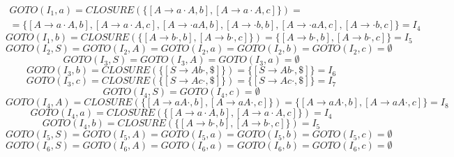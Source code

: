 \documentclass[11pt]{article}
\begin{document}
\begin{multline*}
GOTO(I_1, a) = CLOSURE(\{[A \rightarrow a\cdot A, b], [A \rightarrow a\cdot A, c]\}) = \\
= \{[A \rightarrow a\cdot A, b], [A \rightarrow a\cdot A, c],
[A \rightarrow \cdot aA, b], [A \rightarrow \cdot b, b],
[A \rightarrow \cdot aA, c], [A \rightarrow \cdot b, c]\} = I_4
\end{multline*}
\begin{equation*}
GOTO(I_1, b) = CLOSURE(\{[A \rightarrow b\cdot, b], [A \rightarrow b\cdot, c]\}) =
\{[A \rightarrow b\cdot, b], [A \rightarrow b\cdot, c]\} = I_5
\end{equation*}
\begin{equation*}
GOTO(I_2, S) = GOTO(I_2, A) = GOTO(I_2, a) = GOTO(I_2, b) = GOTO(I_2, c) = \emptyset
\end{equation*}
\begin{equation*}
GOTO(I_3, S) = GOTO(I_3, A) = GOTO(I_3, a) = \emptyset
\end{equation*}
\begin{equation*}
GOTO(I_3, b) = CLOSURE(\{[S \rightarrow Ab\cdot, \$]\}) = \{[S \rightarrow Ab\cdot, \$]\} = I_6
\end{equation*}
\begin{equation*}
GOTO(I_3, c) = CLOSURE(\{[S \rightarrow Ac\cdot, \$]\}) = \{[S \rightarrow Ac\cdot, \$]\} = I_7
\end{equation*}
\begin{equation*}
GOTO(I_4, S) = GOTO(I_4, c) = \emptyset
\end{equation*}
\begin{equation*}
GOTO(I_4, A) = CLOSURE(\{[A \rightarrow aA\cdot, b], [A \rightarrow aA\cdot, c]\}) =
\{[A \rightarrow aA\cdot, b], [A \rightarrow aA\cdot, c]\} = I_8
\end{equation*}
\begin{equation*}
GOTO(I_4, a) = CLOSURE(\{[A \rightarrow a\cdot A, b], [A \rightarrow a\cdot A, c]\}) = I_4
\end{equation*}
\begin{equation*}
GOTO(I_4, b) = CLOSURE(\{[A \rightarrow b\cdot, b], [A \rightarrow b\cdot, c]\}) = I_5
\end{equation*}
\begin{equation*}
GOTO(I_5, S) = GOTO(I_5, A) = GOTO(I_5, a) = GOTO(I_5, b) = GOTO(I_5, c) = \emptyset
\end{equation*}
\begin{equation*}
GOTO(I_6, S) = GOTO(I_6, A) = GOTO(I_6, a) = GOTO(I_6, b) = GOTO(I_6, c) = \emptyset
\end{equation*}
\end{document}
